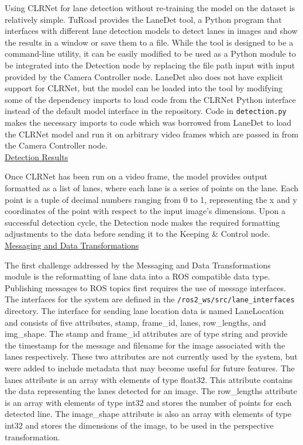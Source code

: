 \documentclass[titlepage,draft]{article}
\begin{document}
{Using CLRNet for lane detection without re-training the model on the dataset is relatively simple.
TuRoad provides the LaneDet \cite{LaneDet} tool, a Python program that interfaces with different lane detection models
to detect lanes in images and show the results in a window or save them to a file.
While the tool is designed to be a command-line utility, it can be easily modified to be used as a Python module
to be integrated into the Detection node by replacing the file path input with input provided by the Camera Controller node.
LaneDet also does not have explicit support for CLRNet, but the model can be loaded into the tool by modifying some of
the dependency imports to load code from the CLRNet Python interface instead of the default model interface in the repository.
Code in \texttt{detection.py} makes the necessary imports to code which was borrowed from LaneDet to load the
CLRNet model and run it on arbitrary video frames which are passed in from the Camera Controller node.
\\

\underline{Detection Results}

Once CLRNet has been run on a video frame, the model provides output formatted as a list of lanes, where each lane is
a series of points on the lane.
Each point is a tuple of decimal numbers ranging from 0 to 1, representing the x and y coordinates of the point with
respect to the input image's dimensions.
Upon a successful detection cycle, the Detection node makes the required formatting adjustments to the data before sending
it to the Keeping \& Control node.
\\


\underline{Messaging and Data Transformations}

The first challenge addressed by the Messaging and Data Transformations module is the reformatting of lane data into a ROS compatible data type. Publishing messages to ROS topics first requires the use of message interfaces. The interfaces for the system are defined in the \texttt{/ros2\_ws/src/lane\_interfaces} directory. The interface for sending lane location data is named LaneLocation and consists of five attributes, stamp, frame\_id, lanes, row\_lengths, and img\_shape. The stamp and frame\_id attributes are of type string and provide the timestamp for the message and filename for the image associated with the lanes respectively. These two attributes are not currently used by the system, but were added to include metadata that may become useful for future features. The lanes attribute is an array with elements of type float32. This attribute contains the data representing the lanes detected for an image. The row\_lengths attribute is an array with elements of type int32 and stores the number of points for each detected line. The image\_shape attribute is also an array with elements of type int32 and stores the dimensions of the image, to be used in the perspective transformation.

}
\end{document}

